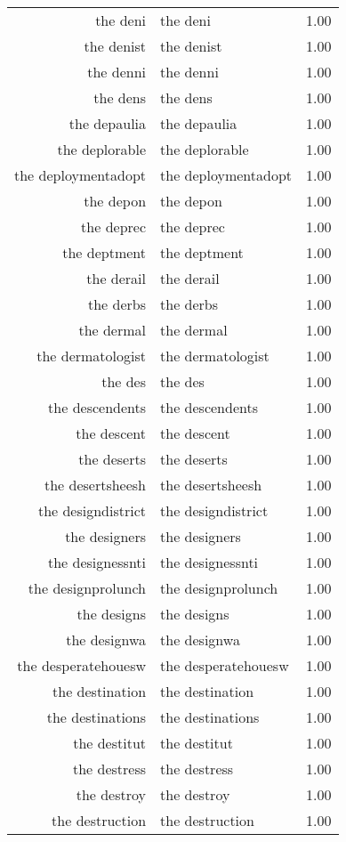 \begin{table}[ht]
\begin{tabular}{rlr}
  the deni & the deni & 1.00 \\ 
  the denist & the denist & 1.00 \\ 
  the denni & the denni & 1.00 \\ 
  the dens & the dens & 1.00 \\ 
  the depaulia & the depaulia & 1.00 \\ 
  the deplorable & the deplorable & 1.00 \\ 
  the deploymentadopt & the deploymentadopt & 1.00 \\ 
  the depon & the depon & 1.00 \\ 
  the deprec & the deprec & 1.00 \\ 
  the deptment & the deptment & 1.00 \\ 
  the derail & the derail & 1.00 \\ 
  the derbs & the derbs & 1.00 \\ 
  the dermal & the dermal & 1.00 \\ 
  the dermatologist & the dermatologist & 1.00 \\ 
  the des & the des & 1.00 \\ 
  the descendents & the descendents & 1.00 \\ 
  the descent & the descent & 1.00 \\ 
  the deserts & the deserts & 1.00 \\ 
  the desertsheesh & the desertsheesh & 1.00 \\ 
  the designdistrict & the designdistrict & 1.00 \\ 
  the designers & the designers & 1.00 \\ 
  the designessnti & the designessnti & 1.00 \\ 
  the designprolunch & the designprolunch & 1.00 \\ 
  the designs & the designs & 1.00 \\ 
  the designwa & the designwa & 1.00 \\ 
  the desperatehouesw & the desperatehouesw & 1.00 \\ 
  the destination & the destination & 1.00 \\ 
  the destinations & the destinations & 1.00 \\ 
  the destitut & the destitut & 1.00 \\ 
  the destress & the destress & 1.00 \\ 
  the destroy & the destroy & 1.00 \\ 
  the destruction & the destruction & 1.00 \\ 

\end{tabular}
\end{table}
